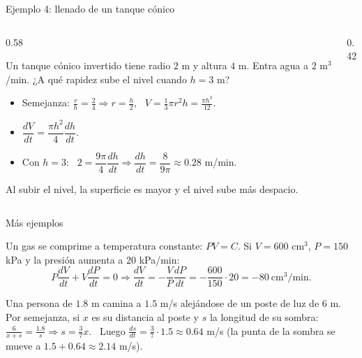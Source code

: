 \documentclass[10pt,aspectratio=169]{beamer}
\begin{document}
\begin{frame}{Ejemplo 4: llenado de un tanque cónico}
  \begin{columns}
    \begin{column}{0.58\textwidth}
      \begin{ejemplo}
        Un tanque cónico invertido tiene radio $2$ m y altura $4$ m. Entra agua a $2$ m$^3$/min. ¿A qué rapidez sube el nivel cuando $h=3$ m?
        \begin{itemize}
          \item Semejanza: $\frac rh=\frac24\Rightarrow r=\frac h2$, \ $V=\frac13\pi r^2h=\frac{\pi h^3}{12}$.
          \item $\dfrac{dV}{dt}=\dfrac{\pi h^2}{4}\dfrac{dh}{dt}$.
          \item Con $h=3$: \ $2=\dfrac{9\pi}{4}\dfrac{dh}{dt}\Rightarrow\dfrac{dh}{dt}=\dfrac{8}{9\pi}\approx0.28$ m/min.
        \end{itemize}
      \end{ejemplo}
      \small Al subir el nivel, la superficie es mayor y el nivel sube más despacio.
    \end{column}
    \begin{column}{0.42\textwidth}
      \centering
    \end{column}
  \end{columns}
\end{frame}

\begin{frame}{Más ejemplos}
  \begin{ejemplo}
    Un gas se comprime a temperatura constante: $PV=C$. Si $V=600$ cm$^3$, $P=150$ kPa y la presión aumenta a $20$ kPa/min:
    \[ P\frac{dV}{dt}+V\frac{dP}{dt}=0\Rightarrow\frac{dV}{dt}=-\frac VP\frac{dP}{dt}=-\frac{600}{150}\cdot20=-80\ \text{cm}^3/\text{min}. \]
  \end{ejemplo}
  \begin{ejemplo}[6: sombra]
    Una persona de $1.8$ m camina a $1.5$ m/s alejándose de un poste de luz de $6$ m. Por semejanza, si $x$ es su distancia al poste y $s$ la longitud de su
    sombra: $\frac{6}{x+s}=\frac{1.8}{s}\Rightarrow s=\frac{3}{7}x$. \ Luego $\frac{ds}{dt}=\frac37\cdot1.5\approx0.64$ m/s
    (la punta de la sombra se mueve a $1.5+0.64\approx2.14$ m/s).
  \end{ejemplo}
\end{frame}
\end{document}
